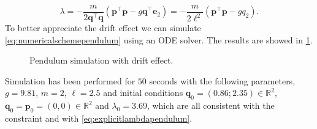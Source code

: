 		\begin{equation}
			\label{eq:explicitlambdapendulum}
			\lambda = -\frac{m}{2\bm{q}^{\intercal}\bm{q}}\left(\bm{p}^{\intercal}\bm{p}-g\bm{q}^{\intercal}\bm{e}_{2}\right) = -\frac{m}{2\ell^{2}}\left(\bm{p}^{\intercal}\bm{p}-gq_{2}\right). 
		\end{equation}
		To better appreciate the drift effect we can simulate \cref{eq:numericalschemependulum} using an ODE solver. The results are showed in \cref{fig:trackingerrosr}.
		\begin{figure}[htbp]
			\centering
			\caption{Pendulum simulation with drift effect.}
			\label{fig:trackingerrosr}
		\end{figure}
		Simulation has been performed for $50$ seconds with the following parameters, $g = 9.81$, $m=2$, $\ell=2.5$ and initial conditions $\bm{q}_{0} = (0.86; 2.35)\in\mathbb{R}^{2}$, $\dot{\bm{q}}_{0} = \bm{p}_{0} = (0,0)\in\mathbb{R}^{2}$ and $\lambda_{0} = 3.69$, which are all consistent with the constraint and with \cref{eq:explicitlambdapendulum}.
		
